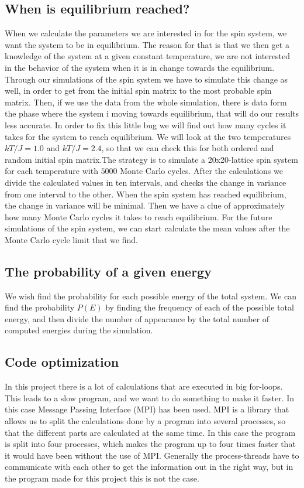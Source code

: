 \documentclass[12pt]{article}
\begin{document}
\begin{flushleft}
\subsection{When is equilibrium reached?}
When we calculate the parameters we are interested in for the spin system, we want the system to be in equilibrium. The reason for that is that we then get a knowledge of the system at a given constant temperature, we are not interested in the behavior of the system when it is in change towards the equilibrium. Through our simulations of the spin system we have to simulate this change as well, in order to get from the initial spin matrix to the most probable spin matrix. Then, if we use the data from the whole simulation, there is data form the phase where the system i moving towards equilibrium, that will do our results less accurate. In order to fix this little bug we will find out how many cycles it takes for the system to reach equilibrium. We will look at the two temperatures $kT/J = 1.0$ and $kT/J = 2.4$, so that we can check this for both ordered and random initial spin matrix.The strategy is to simulate a 20x20-lattice spin system for each temperature with $5000$ Monte Carlo cycles. After the calculations we divide the calculated values in ten intervals, and checks the change in variance from one interval to the other. When the spin system has reached equilibrium, the change in variance will be minimal. Then we have a clue of approximately how many Monte Carlo cycles it takes to reach equilibrium. For the future simulations of the spin system, we can start calculate the mean values after the Monte Carlo cycle limit that we find. 

\subsection{The probability of a given energy}
We wish find the probability for each possible energy of the total system. We can find the probability $P(E)$ by finding the frequency of each of the possible total energy, and then divide the number of appearance by the total number of computed energies during the simulation. 

\subsection{Code optimization}
In this project there is a lot of calculations that are executed in big for-loops. This leads to a slow program, and we want to do something to make it faster. In this case Message Passing Interface (MPI) has been used.  MPI is a library that allows us to split the calculations done by a program into several processes, so that the different parts are calculated at the same time. In this case the program is split into four processes, which makes the program up to four times faster that it would have been without the use of MPI. Generally the process-threads have to communicate with each other to get the information out in the right way, but in the program made for this project this is not the case.   


\end{flushleft}
\end{document}
